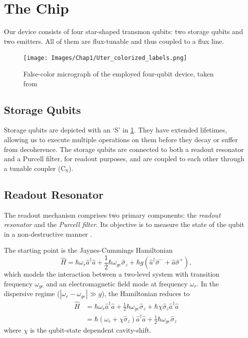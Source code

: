 \section{The Chip}
\label{sec:our_setup}

Our device consists of four star-shaped transmon qubits: two storage qubits and two emitters.
All of them are flux-tunable and thus coupled to a flux line.

\begin{figure}
    \centering
    \texttt{[image: Images/Chap1/Uter\_colorized\_labels.png]}
    \caption{False-color micrograph of the employed four-qubit device, taken from \cite{HernandezAnton2023}}
    \label{fig:our_chip}
\end{figure}

\subsection{Storage Qubits}
Storage qubits are depicted with an ‘S' in \cref{fig:our_chip}.
They have extended lifetimes, allowing us to execute multiple operations on them before they decay or suffer from decoherence.
The storage qubits are connected to both a readout resonator and a Purcell filter, for readout purposes, and are coupled to each other through a tunable coupler ($\text{C}_\text{S}$).

\subsection{Readout Resonator}

The readout mechanism comprises two primary components: the \emph{readout resonator} and the \emph{Purcell filter}. 
Its objective is to measure the state of the qubit in a non-destructive manner \cite{singleshot_readout}.

The starting point is the Jaynes-Cummings Hamiltonian \cite{haroche2006exploring}
\begin{equation}
    \hat{H} = \hbar \omega_r \hat{a}^\dagger \hat{a} + \frac{1}{2} \hbar \omega_{ge} \hat{\sigma}_z + \hbar g (\hat{a}^\dagger \hat{\sigma}^- + \hat{a} \hat{\sigma}^+) ,
\end{equation}
which models the interaction between a two-level system with transition frequency $\omega_{ge}$ and an electromagnetic field mode at frequency $\omega_r$.
In the dispersive regime ($|\omega_r - \omega_{ge}| \gg g$), the Hamiltonian reduces to \cite{transmon_regime}
\begin{align}
    \hat{H} &= \hbar \omega_r \hat{a}^\dagger \hat{a} + \frac{1}{2} \hbar \omega_{ge} \hat{\sigma}_z + \hbar \chi \hat{\sigma}_z \hat{a}^\dagger \hat{a} \\
    &= \hbar (\omega_r + \chi \hat{\sigma}_z ) \hat{a}^\dagger \hat{a} +
    \frac{1}{2} \hbar \omega_{ge} \hat{\sigma}_z 
\end{align}
where $\chi$ is the qubit-state dependent cavity-shift.

